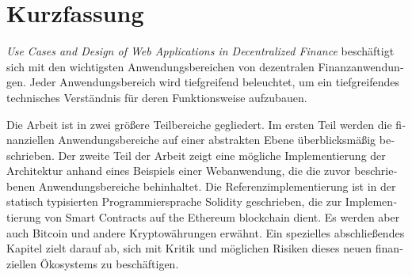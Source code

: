 \chapter{Kurzfassung}

\begin{german}
\textit{Use Cases and Design of Web Applications in Decentralized Finance} beschäftigt sich mit den wichtigsten Anwendungsbereichen von dezentralen
Finanzanwendungen. Jeder Anwendungsbereich wird tiefgreifend beleuchtet, um ein tiefgreifendes technisches Verständnis für deren Funktionsweise
aufzubauen.

Die Arbeit ist in zwei größere Teilbereiche gegliedert. Im ersten Teil werden die finanziellen Anwendungsbereiche auf einer abstrakten Ebene
überblicksmäßig beschrieben. Der zweite Teil der Arbeit zeigt eine mögliche Implementierung der Architektur anhand eines Beispiels einer Webanwendung,
die die zuvor beschriebenen Anwendungsbereiche behinhaltet. Die Referenzimplementierung ist in der statisch typisierten Programmiersprache Solidity
geschrieben, die zur Implementierung von Smart Contracts auf the Ethereum blockchain dient. Es werden aber auch Bitcoin und andere
Kryptowährungen erwähnt. Ein spezielles abschließendes Kapitel zielt darauf ab, sich mit Kritik und möglichen Risiken dieses neuen finanziellen
Ökosystems zu beschäftigen.
\end{german}
